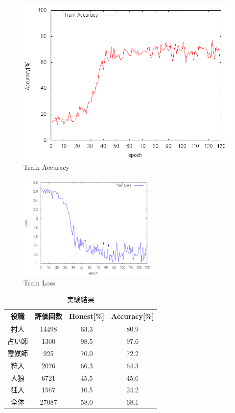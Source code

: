 \documentclass{jarticle}
\begin{document}
\begin{figure}[t]
  \begin{center}
  \includegraphics[width=7 cm]{./Accuracy.PNG}
  \end{center}
 \caption{Train Accuracy \label{fig:acc}}
 \end{figure}

\setlength\textfloatsep{15pt}
\begin{figure}[t]
  \begin{center}
  \includegraphics[width=7cm]{./Loss.PNG}
  \end{center}
 \caption{Train Loss \label{fig:loss}}
 \end{figure}


\setlength\textfloatsep{5pt}
\begin{table}[t]
    \begin{center}
    \caption{実験結果 \label{tb:ex}}
 \begin{tabular}{|c|c|c|c|}
 \hline
  役職&評価回数&Honest[\%]&Accuracy[\%]\\
  \hline \hline
  村人&14498&63.3&80.9\\
  \hline
  占い師&1300&98.5&97.6\\
  \hline
  霊媒師&925&70.0&72.2\\
  \hline
  狩人&2076&66.3&64.3\\
  \hline
  人狼&6721&45.5&45.6\\
  \hline
  狂人&1567&10.5&24.2\\
  \hline
  全体&27087&58.0&68.1\\
  \hline
 \end{tabular}
 \end{center}
\end{table}
\end{document}
